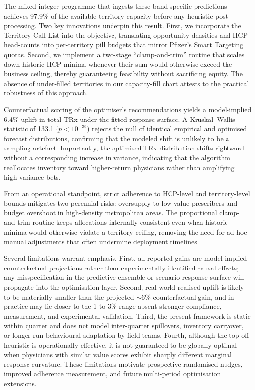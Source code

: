 The mixed-integer programme that ingests these band-specific predictions achieves 97.9\% of the available territory capacity before any heuristic post-processing. Two key innovations underpin this result. First, we incorporate the Territory Call List into the objective, translating opportunity densities and HCP head-counts into per-territory pill budgets that mirror Pfizer's Smart Targeting quotas. Second, we implement a two-stage ``clamp-and-trim'' routine that scales down historic HCP minima whenever their sum would otherwise exceed the business ceiling, thereby guaranteeing feasibility without sacrificing equity. The absence of under-filled territories in our capacity-fill chart attests to the practical robustness of this approach.

Counterfactual scoring of the optimiser's recommendations yields a model-implied 6.4\% uplift in total TRx under the fitted response surface. A Kruskal--Wallis statistic of 133.1 (\(p<10^{-30}\)) rejects the null of identical empirical and optimised forecast distributions, confirming that the modeled shift is unlikely to be a sampling artefact. Importantly, the optimised TRx distribution shifts rightward without a corresponding increase in variance, indicating that the algorithm reallocates inventory toward higher-return physicians rather than amplifying high-variance bets.

From an operational standpoint, strict adherence to HCP-level and territory-level bounds mitigates two perennial risks: oversupply to low-value prescribers and budget overshoot in high-density metropolitan areas. The proportional clamp-and-trim routine keeps allocations internally consistent even when historic minima would otherwise violate a territory ceiling, removing the need for ad-hoc manual adjustments that often undermine deployment timelines.

Several limitations warrant emphasis. First, all reported gains are model-implied counterfactual projections rather than experimentally identified causal effects; any misspecification in the predictive ensemble or scenario-response surface will propagate into the optimisation layer. Second, real-world realised uplift is likely to be materially smaller than the projected \(\sim 6\%\) counterfactual gain, and in practice may lie closer to the 1 to 3\% range absent stronger compliance, measurement, and experimental validation. Third, the present framework is static within quarter and does not model inter-quarter spillovers, inventory carryover, or longer-run behavioural adaptation by field teams. Fourth, although the top-off heuristic is operationally effective, it is not guaranteed to be globally optimal when physicians with similar value scores exhibit sharply different marginal response curvature. These limitations motivate prospective randomised nudges, improved adherence measurement, and future multi-period optimisation extensions.

